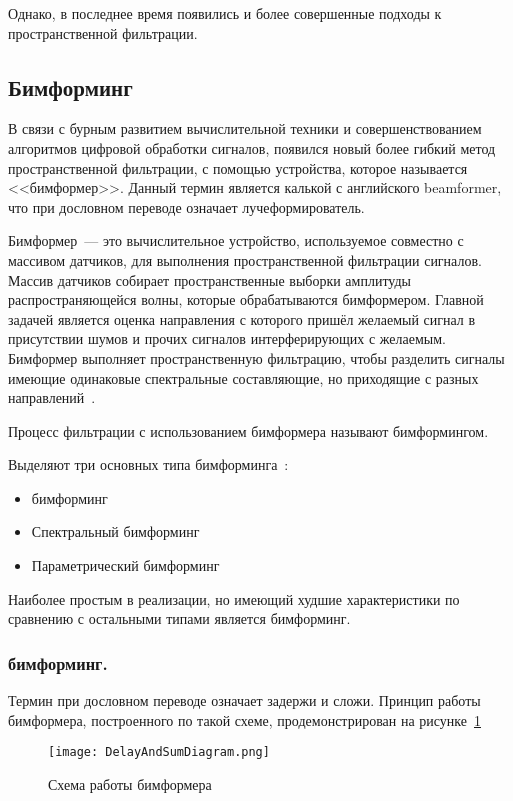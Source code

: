 Однако, в последнее время появились и более совершенные подходы к пространственной фильтрации.

\subsection{Бимформинг}
\label{section:Beamforming}
В связи с бурным развитием вычислительной техники и совершенствованием алгоритмов цифровой обработки сигналов, появился новый более гибкий метод пространственной фильтрации, с помощью устройства, которое называется <<бимформер>>. Данный термин является калькой с английского \foreignlanguage{english}{beamformer}, что при дословном переводе означает лучеформирователь.

Бимформер~--- это вычислительное устройство, используемое совместно с массивом датчиков, для выполнения пространственной фильтрации сигналов. Массив датчиков собирает пространственные выборки амплитуды распространяющейся волны, которые обрабатываются бимформером. Главной задачей является оценка направления с которого пришёл желаемый сигнал в присутствии шумов и прочих сигналов интерферирующих с желаемым. Бимформер выполняет пространственную фильтрацию, чтобы разделить сигналы имеющие одинаковые спектральные составляющие, но приходящие с разных направлений~\cite{IEEE_Beamforming}.

Процесс фильтрации с использованием бимформера называют бимформингом.

Выделяют три основных типа бимформинга~\cite{Wiki_SensorArray}:
\begin{itemize}
	\item \dands{} бимформинг
	\item Спектральный бимформинг
	\item Параметрический бимформинг
\end{itemize}
Наиболее простым в реализации, но имеющий худшие характеристики по сравнению с остальными типами является \dands{} бимформинг.

\subsubsection{\dands{} бимформинг. }
\label{section:DelayAndSumBeamforming}
Термин \dands{} при дословном переводе означает задержи и сложи. Принцип работы бимформера, построенного по такой схеме, продемонстрирован на рисунке~\ref{fig:DelayAndSumDiagram}

\begin{figure}[ht]
	\centering
	\texttt{[image: DelayAndSumDiagram.png]}  
	\caption{Схема работы \dands{} бимформера}
	\label{fig:DelayAndSumDiagram}
\end{figure}


